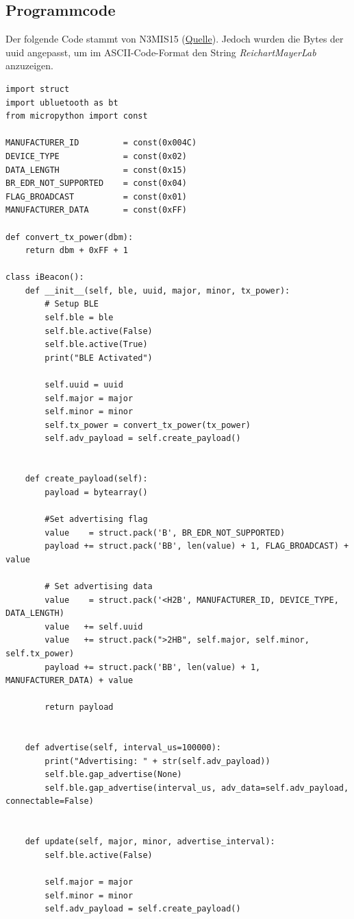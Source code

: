 \documentclass[twoside]{article}
\begin{document}
\subsection{Programmcode}
Der folgende Code stammt von N3MIS15 (\href{https://gist.github.com/N3MIS15/589062360a658a36b9c810fec8bb0c91}{Quelle}). Jedoch wurden die Bytes der uuid angepasst, um im ASCII-Code-Format den String \textit{ReichartMayerLab} anzuzeigen.
\begin{verbatim}
import struct
import ubluetooth as bt
from micropython import const

MANUFACTURER_ID         = const(0x004C)
DEVICE_TYPE             = const(0x02)
DATA_LENGTH             = const(0x15)
BR_EDR_NOT_SUPPORTED    = const(0x04)
FLAG_BROADCAST          = const(0x01)
MANUFACTURER_DATA       = const(0xFF)

def convert_tx_power(dbm):
    return dbm + 0xFF + 1

class iBeacon():
    def __init__(self, ble, uuid, major, minor, tx_power):
        # Setup BLE
        self.ble = ble
        self.ble.active(False)
        self.ble.active(True)
        print("BLE Activated")

        self.uuid = uuid
        self.major = major
        self.minor = minor
        self.tx_power = convert_tx_power(tx_power)
        self.adv_payload = self.create_payload()


    def create_payload(self):
        payload = bytearray()
            
        #Set advertising flag
        value    = struct.pack('B', BR_EDR_NOT_SUPPORTED)
        payload += struct.pack('BB', len(value) + 1, FLAG_BROADCAST) + value

        # Set advertising data
        value    = struct.pack('<H2B', MANUFACTURER_ID, DEVICE_TYPE, DATA_LENGTH) 
        value   += self.uuid
        value   += struct.pack(">2HB", self.major, self.minor, self.tx_power)
        payload += struct.pack('BB', len(value) + 1, MANUFACTURER_DATA) + value

        return payload


    def advertise(self, interval_us=100000):
        print("Advertising: " + str(self.adv_payload))
        self.ble.gap_advertise(None)
        self.ble.gap_advertise(interval_us, adv_data=self.adv_payload, connectable=False)


    def update(self, major, minor, advertise_interval):
        self.ble.active(False)

        self.major = major
        self.minor = minor
        self.adv_payload = self.create_payload()


\end{verbatim}
\end{document}
